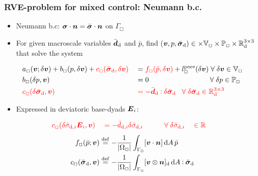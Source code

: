 \documentclass[11pt]{beamer} %
\renewcommand{\dev}{\mathrm{d}}
\newcommand{\pore}{\mathrm{pore}}
\begin{document}
\begin{frame}
\frametitle{RVE-problem for mixed control: Neumann b.c.}
 \begin{itemize}
  \item Neumann b.c: $\boldsymbol{\sigma}\cdot\boldsymbol{n} = \bar{\boldsymbol{\sigma}}\cdot\boldsymbol{n}$ on $\Gamma_\Box$
  \item For given macroscale variables $\bar{\ts d}_\dev$ and $\bar p$, find ($\ta{v},p,\bar{\ts\sigma}_\dev)\in\times\set{V}_\Box\times\set{P}_\Box\times\set{R}_\dev^{3\times3}$ that solve the system
 \end{itemize}
\vspace{-2truemm}
\begin{alignat*}{4}
    & a_\Box(\ta{v};\delta \ta{v}) +  b_\Box(p,\delta\ta{v}) + {\color{red}c_\Box(\bar{\ts\sigma}_\dev, \delta\ta v)}
    && =
    {\color{red}f_\Box(\bar{p},\delta\ta v)} + l^\pore_\Box(\delta \ta{v})
    \;\forall\; \delta \ta{v} \in \set{V}_\Box
 \\
    &b_\Box(\delta p, \ta{v})
    && =
    0
    \qquad\qquad\qquad\qquad\;\;\forall\; \delta p \in \set{P}_\Box
\\
    &\color{red}c_\Box(\delta\bar{\ts\sigma}_\dev, \ta v)
    && \color{red}=
    -\bar{\ts d}_\dev \dprod \delta\bar{\ts\sigma}_\dev
    \;\;\;\forall\; \delta\bar{\ts\sigma}_\dev \in \set{R}^{3\times 3}_\dev
\end{alignat*}
\vspace{-5truemm}
\begin{itemize}
 \item Expressed in deviatoric base-dyads $\boldsymbol{E}_i$:
\end{itemize}
\begin{alignat*}{4}
 &\color{red}c_\Box(\delta\bar{\sigma}_{\dev,i} \ts E_i, \ta v) &&\color{red}= -\bar{d}_{\dev,i} \delta\bar{\sigma}_{\dev,i}
&\quad\quad& \color{red}\forall\; \delta\bar{\sigma}_{\dev,i} &&\color{red}\in \set{R}
\end{alignat*}
\begin{align*}
    f_\Box(\bar{p};\ta{v}) & \defeq -\frac{1}{|\Omega_\Box|} \int_{\Gamma_\Box} [\ta v\cdot\ta n]\dif A \,\bar{p}
\\
    c_\Box(\bar{\ts\sigma}_\dev, \ta v) & \defeq -\frac{1}{|\Omega_\Box|} \int_{\Gamma_\Box} [\ta v\outerp\ta n]_\dev \dif A\dprod \bar{\ts\sigma}_\dev
\end{align*}
\end{frame}
\end{document}
